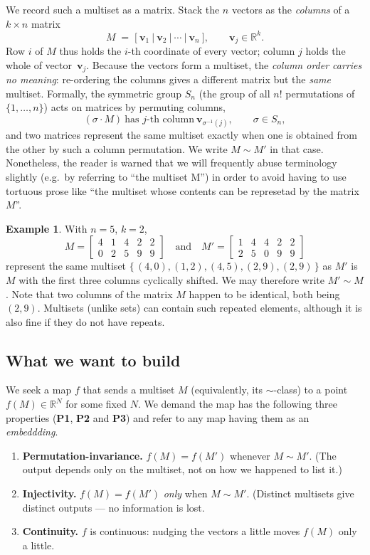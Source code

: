 \documentclass[11pt,a4paper]{article}
\theoremstyle{definition}
\newtheorem{example}[definition]{Example}
\theoremstyle{plain}
\newcommand{\R}{\mathbb{R}}
\newcommand{\Sn}{S_n}
\newcommand{\bvec}[1]{\mathbf{#1}}
\begin{document}
We record such a multiset as a matrix.  Stack the $n$ vectors as the
\emph{columns} of a $k\times n$ matrix
\[
   M \;=\; \bigl[\ \bvec v_1\ \big|\ \bvec v_2\ \big|\ \cdots\ \big|\ \bvec v_n\ \bigr],
   \qquad \bvec v_j\in\R^k .
\]
Row $i$ of $M$ thus holds the $i$-th coordinate of every vector; column $j$
holds the whole of vector~$\bvec v_j$.  Because the vectors form a multiset, the
\emph{column order carries no meaning}: re-ordering the columns gives a
different matrix but the \emph{same} multiset.  Formally, the symmetric group
$\Sn$ (the group of all $n!$ permutations of $\{1,\dots,n\}$) acts on matrices
by permuting columns,
\[
   (\sigma\cdot M)\ \text{has $j$-th column}\ \bvec v_{\sigma^{-1}(j)},
   \qquad \sigma\in\Sn,
\]
and two matrices represent the same multiset exactly when one is obtained from
the other by such a column permutation. We write $M\sim M'$ in that case.  Nonetheless, the reader is warned that we will frequently abuse terminology slightly (e.g.~by referring to 
``the multiset M'') in order to avoid having to use tortuous prose like 
 ``the multiset whose contents can be represetad by the matrix $M$''.  

\begin{example}\label{ex:samemultiset}
With $n=5$, $k=2$,
\[
  M=\begin{bmatrix}4&1&4&2&2\\0&2&5&9&9\end{bmatrix}
  \quad\text{and}\quad
  M'=\begin{bmatrix}1&4&4&2&2\\2&5&0&9&9\end{bmatrix}
\]
represent the same multiset $\bigl\{\,(4,0),(1,2),(4,5),(2,9),(2,9)\,\bigr\}$ as $M'$ is $M$
with the first three columns cyclically shifted.  We may therefore write $M'\sim  M$.  Note that two columns of the matrix $M$ happen to be identical, both being $(2,9)$.  Multisets (unlike sets) can contain such repeated elements, although it is also fine if they do not have repeats.
\end{example}

\subsection{What we want to build}

We seek a map $f$ that sends a multiset $M$ (equivalently, its $\sim$-class) to a
point $f(M)\in\R^N$ for some fixed $N$. We demand the map has the following three properties (\textbf{P1}, \textbf{P2} and \textbf{P3})
and refer to any map having them as an \emph{embeddding}.
\begin{enumerate}[label=\textbf{(P\arabic*)},leftmargin=*]
\item \textbf{Permutation-invariance.} $f(M)=f(M')$ whenever $M\sim M'$. (The
      output depends only on the multiset, not on how we happened to list it.)
\item \textbf{Injectivity.} $f(M)=f(M')$ \emph{only} when $M\sim M'$. (Distinct
      multisets give distinct outputs --- no information is lost.
\item \textbf{Continuity.} $f$ is continuous: nudging the vectors a little moves
      $f(M)$ only a little.
\end{enumerate}
%
\end{document}
